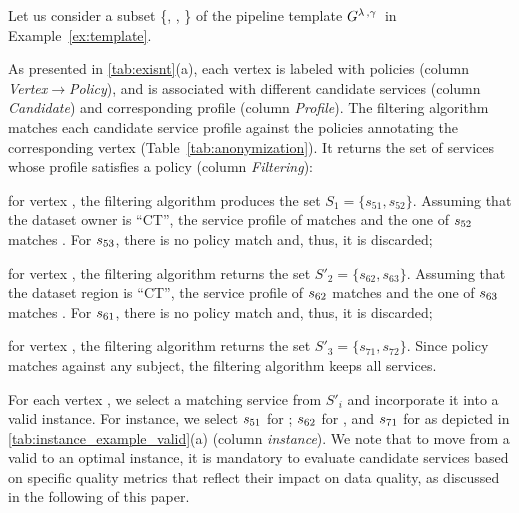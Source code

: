 \begin{example}[\bf \pipelineInstance]\label{ex:instance}

Let us consider a subset \{, , \} of the pipeline template $G^{\lambda\,,\gamma\,}$ in Example~\ref{ex:template}.

As presented in \cref{tab:exisnt}(a), each vertex is labeled with policies (column \emph{Vertex$\rightarrow$Policy}), and is associated with different candidate services (column \emph{Candidate}) and corresponding profile (column \emph{Profile}). The filtering algorithm matches each candidate service profile against the policies annotating the corresponding vertex (Table~\ref{tab:anonymization}). It returns the set of services whose profile satisfies a policy (column \emph{Filtering}):
\begin{enumerate*}[label=\textit{\roman*})]
  \item for vertex , the filtering algorithm produces the set $S_{1}=\{s_{51},s_{52}\}$. Assuming that the dataset owner is ``CT'', the service profile of  matches  and the one of $s_{52}$ matches . For $s_{53}$, there is no policy match and, thus, it is discarded;
  \item for vertex , the filtering algorithm returns the set $S'_2=\{s_{62},s_{63}\}$. Assuming that the dataset region is ``CT'', the service profile of $s_{62}$ matches  and the one of $s_{63}$ matches . For $s_{61}$, there is no policy match and, thus, it is discarded;
  \item for vertex , the filtering algorithm returns the set $S'_3=\{s_{71},s_{72}\}$. Since policy  matches against any subject, the filtering algorithm keeps all services.
\end{enumerate*}

For each vertex , we select a matching service  from $S'_i$ and incorporate it into a valid instance. For instance, we select $s_{51}$ for ; $s_{62}$ for , and $s_{71}$ for  as depicted in \cref{tab:instance_example_valid}(a) (column \emph{instance}). We note that to move from a valid to an optimal instance, it is mandatory to evaluate candidate services based on specific quality metrics that reflect their impact on data quality, as discussed in the following of this paper.

\end{example}


